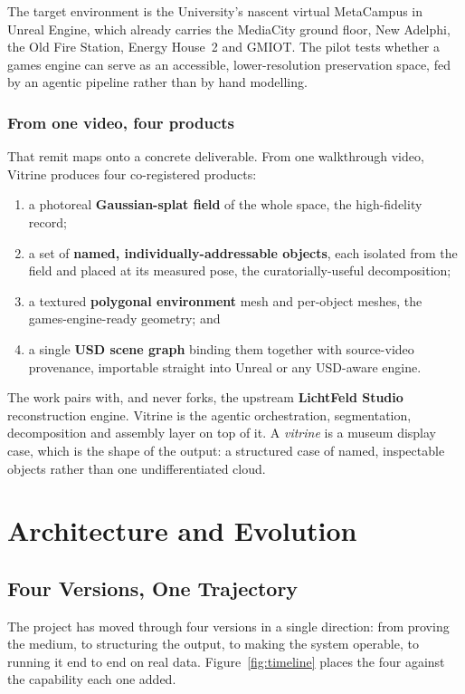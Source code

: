 \documentclass[a4paper,11pt]{report}
\begin{document}
The target environment is the University's nascent virtual MetaCampus in Unreal Engine, which already
carries the MediaCity ground floor, New Adelphi, the Old Fire Station, Energy House~2 and GMIOT. The pilot
tests whether a games engine can serve as an accessible, lower-resolution preservation space, fed by an
agentic pipeline rather than by hand modelling.

\section{From one video, four products}
That remit maps onto a concrete deliverable. From one walkthrough video, Vitrine produces four
co-registered products:

\begin{enumerate}
  \item a photoreal \textbf{Gaussian-splat field} of the whole space, the high-fidelity record;
  \item a set of \textbf{named, individually-addressable objects}, each isolated from the field and placed
        at its measured pose, the curatorially-useful decomposition;
  \item a textured \textbf{polygonal environment} mesh and per-object meshes, the games-engine-ready
        geometry; and
  \item a single \textbf{USD scene graph} binding them together with source-video provenance, importable
        straight into Unreal or any USD-aware engine.
\end{enumerate}

The work pairs with, and never forks, the upstream \textbf{LichtFeld Studio} reconstruction engine.
Vitrine is the agentic orchestration, segmentation, decomposition and assembly layer on top of it. A
\emph{vitrine} is a museum display case, which is the shape of the output: a structured case of named,
inspectable objects rather than one undifferentiated cloud.

\part{Architecture and Evolution}

\chapter{Four Versions, One Trajectory}

The project has moved through four versions in a single direction: from proving the medium, to structuring
the output, to making the system operable, to running it end to end on real data. Figure~\ref{fig:timeline}
places the four against the capability each one added.
\end{document}
